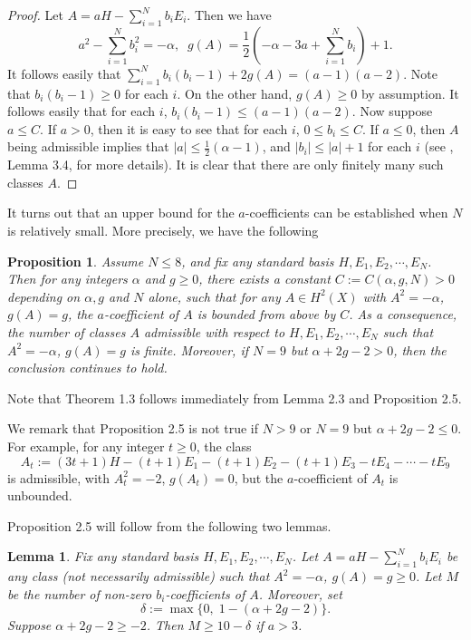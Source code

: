 \documentclass[11pt]{amsart}
\theoremstyle{plain}
\numberwithin{theorem}{section}
\newtheorem{lemma}[theorem]{Lemma}
\newtheorem{proposition}[theorem]{Proposition}
\theoremstyle{definition}
\begin{document}
\begin{proof}
Let $A=aH-\sum_{i=1}^N b_iE_i$. Then we have 
$$
a^2-\sum_{i=1}^N b_{i}^2=-\alpha,\;\; g(A)=\frac{1}{2}(-\alpha-3a+\sum_{i=1}^N b_{i})+1.
$$
It follows easily that $\sum_{i=1}^N b_i(b_i-1) +2g(A)=(a-1)(a-2)$. Note that $b_i(b_i-1)\geq 0$ 
for each $i$. On the other hand, $g(A)\geq 0$ by assumption. It follows easily that for each $i$, $b_i(b_i-1) \leq (a-1)(a-2)$. Now suppose $a\leq C$. If $a>0$, then it is easy to see that for each 
$i$, $0\leq b_i\leq C$. If $a\leq 0$, then $A$ being admissible implies that 
$|a|\leq \frac{1}{2}(\alpha-1)$, and $|b_i|\leq |a|+1$ for each $i$ (see \cite{C}, Lemma 3.4, for more details). It is clear that there are only finitely many such classes $A$.

\end{proof}

It turns out that an upper bound for the $a$-coefficients can be established when $N$ is relatively small. More precisely, we have the following

\begin{proposition}
Assume $N\leq 8$, and fix any standard basis $H,E_1,E_2,\cdots,E_N$. Then for any integers 
$\alpha$ and $g\geq 0$, there exists a constant $C:=C(\alpha,g,N)>0$ depending on $\alpha, g$ and $N$ alone, 
such that for any $A\in H^2(X)$ with $A^2=-\alpha$, $g(A)=g$, the $a$-coefficient of $A$ is bounded from above by $C$. As a consequence, the number of classes $A$ admissible with respect to $H,E_1,E_2,\cdots,E_N$ such that $A^2=-\alpha$, $g(A)=g$ is finite. Moreover, if $N=9$ but $\alpha+2g-2>0$, then the conclusion continues to hold. 

\end{proposition}

Note that Theorem 1.3 follows immediately from Lemma 2.3 and Proposition 2.5. 

We remark that Proposition 2.5 is not true if $N>9$ or $N=9$ but $\alpha+2g-2\leq 0$. For example, for any integer $t\geq 0$, the class
$$
A_t:=(3t+1)H-(t+1)E_1-(t+1)E_2-(t+1)E_3-tE_4-\cdots-tE_9
$$
is admissible, with $A_t^2=-2$, $g(A_t)=0$, but the $a$-coefficient of $A_t$ is unbounded. 

Proposition 2.5 will follow from the following two lemmas. 

\begin{lemma}
Fix any standard basis $H,E_1,E_2,\cdots,E_N$. Let $A=aH-\sum_{i=1}^N b_iE_i$ 
be any class (not necessarily admissible) such that $A^2=-\alpha$, $g(A)=g\geq 0$. Let $M$ be the number of non-zero $b_i$-coefficients of $A$. Moreover, set
$$
\delta:=\max \{0, \; 1-(\alpha+2g-2)\}. 
$$
Suppose $\alpha+2g-2\geq -2$. Then $M\geq 10-\delta$ if $a>3$.
\end{lemma}
\end{document}
